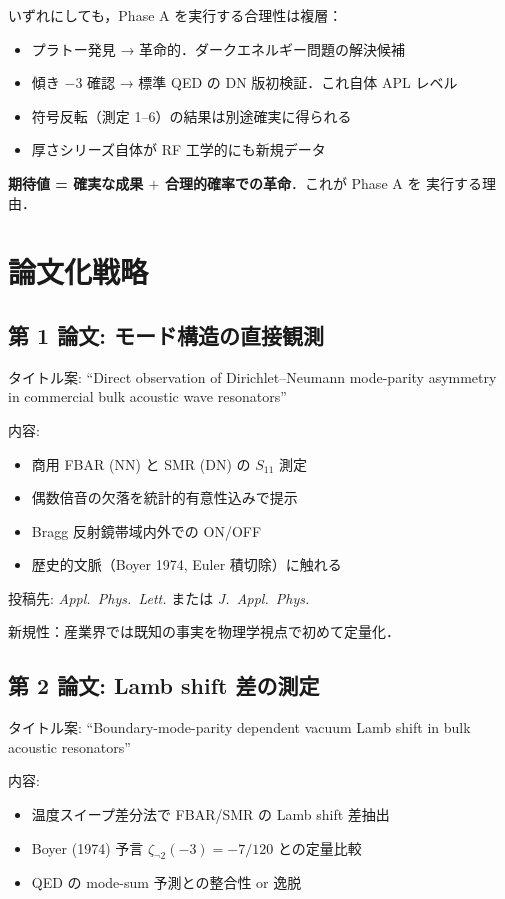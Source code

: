 \documentclass[11pt,a4paper]{article}
\begin{document}
いずれにしても，Phase A を実行する合理性は複層：
\begin{itemize}
\item プラトー発見 → 革命的．ダークエネルギー問題の解決候補
\item 傾き $-3$ 確認 → 標準 QED の DN 版初検証．これ自体 APL レベル
\item 符号反転（測定 1--6）の結果は別途確実に得られる
\item 厚さシリーズ自体が RF 工学的にも新規データ
\end{itemize}

\textbf{期待値 = 確実な成果 $+$ 合理的確率での革命}．これが Phase A を
実行する理由．

\section{論文化戦略}

\subsection{第 1 論文: モード構造の直接観測}

タイトル案: ``Direct observation of Dirichlet--Neumann mode-parity
asymmetry in commercial bulk acoustic wave resonators''

内容:
\begin{itemize}
\item 商用 FBAR (NN) と SMR (DN) の $S_{11}$ 測定
\item 偶数倍音の欠落を統計的有意性込みで提示
\item Bragg 反射鏡帯域内外での ON/OFF
\item 歴史的文脈（Boyer 1974, Euler 積切除）に触れる
\end{itemize}

投稿先: \textit{Appl.\ Phys.\ Lett.} または \textit{J.\ Appl.\ Phys.}

新規性：産業界では既知の事実を物理学視点で初めて定量化．

\subsection{第 2 論文: Lamb shift 差の測定}

タイトル案: ``Boundary-mode-parity dependent vacuum Lamb shift
in bulk acoustic resonators''

内容:
\begin{itemize}
\item 温度スイープ差分法で FBAR/SMR の Lamb shift 差抽出
\item Boyer (1974) 予言 $\zeta_{\neg 2}(-3) = -7/120$ との定量比較
\item QED の mode-sum 予測との整合性 or 逸脱
\end{itemize}
\end{document}
